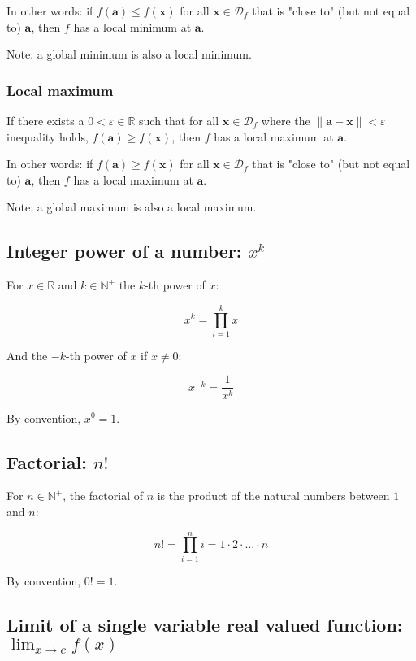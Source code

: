 \documentclass[titlepage]{article}
\begin{document}
          In other words: if $f(\mathbf{a}) \leq f(\mathbf{x})$ for all
          $\mathbf{x} \in \mathcal{D}_f$ that is "close to" (but not equal to)
          $\mathbf{a}$, then $f$ has a local minimum at $\mathbf{a}$.

          Note: a global minimum is also a local minimum.

        \subsubsection{Local maximum}

          If there exists a $0 < \varepsilon \in \mathbb{R}$ such that for all
          $\mathbf{x} \in \mathcal{D}_f$ where the
          $\| \mathbf{a} - \mathbf{x} \| < \varepsilon$ inequality holds,
          $f(\mathbf{a}) \geq f(\mathbf{x})$, then $f$ has a local maximum at
          $\mathbf{a}$.

          In other words: if $f(\mathbf{a}) \geq f(\mathbf{x})$ for all
          $\mathbf{x} \in \mathcal{D}_f$ that is "close to" (but not equal to)
          $\mathbf{a}$, then $f$ has a local maximum at $\mathbf{a}$.

          Note: a global maximum is also a local maximum.

      \subsection{Integer power of a number: $x^k$}

        For $x \in \mathbb{R}$ and $k \in \mathbb{N}^+$ the $k$-th power of $x$:

        $$x^k = \prod_{i=1}^k x$$

        And the $-k$-th power of $x$ if $x \neq 0$:

        $$x^{-k} = \frac{1}{x^k}$$

        By convention, $x^0 = 1$.

      \subsection{Factorial: $n!$}

        For $n \in \mathbb{N}^+$, the factorial of $n$ is the product of
        the natural numbers between $1$ and $n$:

        $$n! = \prod_{i=1}^n i = 1 \cdot 2 \cdot \ldots \cdot n$$

        By convention, $0! = 1$.

      \subsection{%
        Limit of a single variable real valued function: $\lim_{x \to c} f(x)$
      }
\end{document}
